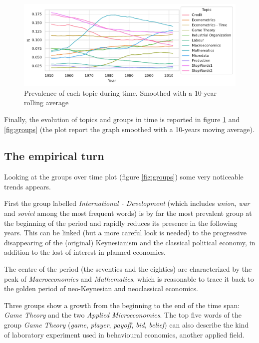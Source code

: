 \documentclass[a4paper, 11pt, headings=standardclasses, tablecaptionsbelow]{scrartcl}
\begin{document}
\begin{figure}[tb]
  \centering
  \includegraphics[width=\textwidth]{src/topics.pdf}
  \caption[Topics]{Prevalence of each topic during time. Smoothed with a 10-year rolling average}
  \label{fig:topics}
\end{figure}

Finally, the evolution of topics and groups in time is reported in figure \ref{fig:topics} and \ref{fig:groups} (the plot report the graph smoothed with a 10-years moving average).

\subsection{The empirical turn}
Looking at the groups over time plot (figure \ref{fig:groups}) some very noticeable trends appears.

First the group labelled \textit{International - Development} (which includes \textit{union}, \textit{war} and \textit{soviet} among the most frequent words) is by far the most prevalent group at the beginning of the period and rapidly reduces its presence in the following years. This can be linked (but a more careful look is needed) to the progressive disappearing of the (original) Keynesianism and the classical political economy, in addition to the lost of interest in planned economies.

The centre of the period (the seventies and the eighties) are characterized by the peak of \textit{Macroeconomics} and \textit{Mathematics}, which is reasonable to trace it back to the golden period of neo-Keynesian and neoclassical economics.

Three groups show a growth from the beginning to the end of the time span: \textit{Game Theory} and the two \textit{Applied Microeconomics}. The top five words of the group \textit{Game Theory} (\textit{game}, \textit{player}, \textit{payoff}, \textit{bid}, \textit{belief}) can also describe the kind of laboratory experiment used in behavioural economics, another applied field.
\end{document}

